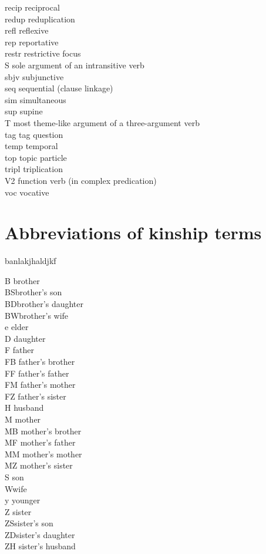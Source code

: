 \begin{refsection}
{\begin{tabbing}
{\sc recip} \> reciprocal\\
{\sc redup}\> reduplication\\
{\sc refl}\> reflexive\\
{\sc rep} \> reportative\\
{\sc restr}\> restrictive focus\\
S 	\> sole argument of an intransitive verb\\
{\sc sbjv} \> subjunctive\\
{\sc seq}\> sequential (clause linkage)\\
{\sc sim} \> simultaneous\\
{\sc sup} \> supine\\
T \> most theme-like argument of a three-argument verb\\
{\sc tag} \> tag question\\
{\sc temp}\> temporal\\
{\sc top} \> topic particle\\
{\sc tripl}\> triplication\\
{\sc V2}\> function verb (in complex predication)\\
{\sc voc}\> vocative\\
\end{tabbing}
}



\section*{Abbreviations of kinship terms}

 {\small
\begin{tabbing}
banlakjhaldjkf\= \kill 

B\> brother\\
BS\>brother's son\\
BD\>brother's daughter\\
BW\>brother's wife\\
e\> elder\\
D\> daughter\\
F \> father\\
FB \> father's brother\\
FF \> father's father\\
FM \> father's mother\\
FZ \> father's sister\\
H\> husband\\
M \> mother\\
MB \> mother's brother\\
MF \> mother's father\\
MM \> mother's mother\\
MZ \> mother's sister\\
S \> son\\
W\>wife\\
y \> younger\\
Z \> sister\\
ZS\>sister's son\\
ZD\>sister's daughter\\
ZH\> sister's husband\\


\end{tabbing}}
\end{refsection}
